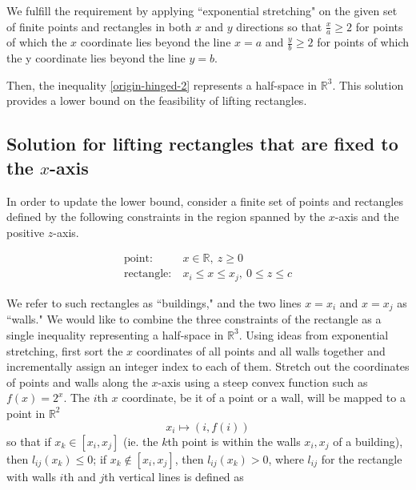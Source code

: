 \documentclass{NSF}
\begin{document}
We fulfill the requirement by applying ``exponential stretching" on the given set of finite points and rectangles in both $x$ and $y$ directions so that $\frac{x}{a} \geq 2$  for points of which the $x$ coordinate lies beyond the line $x=a$ and $\frac{y}{b} \geq 2$ for points of which the y coordinate lies beyond the line $y=b$. 

Then, the inequality \eqref{origin-hinged-2} represents a half-space in $\mathbb{R}^3$. This solution provides a lower bound on the feasibility of lifting rectangles.



\subsection{Solution for lifting rectangles that are fixed to the \texorpdfstring{$x$}{x}-axis}

In order to update the lower bound, consider a finite set of points and rectangles defined by the following constraints in the region spanned by the $x$-axis and the positive $z$-axis.

\begin{align*}
    \text{point:}& \ x \in \mathbb{R},\  z \geq 0 \\
    \text{rectangle:}& \ x_i \leq x \leq x_j,\ 0 \leq z \leq c
\end{align*}

We refer to such rectangles as ``buildings," and the two lines $x=x_i$ and $x=x_j$ as ``walls."
We would like to combine the three constraints of the rectangle as a single inequality representing a half-space in $\mathbb{R}^3$.
Using ideas from exponential stretching, first sort the $x$ coordinates of all points and all walls together and incrementally assign an integer index to each of them. Stretch out the coordinates of points and walls along the $x$-axis using a steep convex function such as $f(x)=2^x$. 
The $i$th $x$ coordinate, be it of a point or a wall, will be mapped to a point in $\mathbb{R}^2$
\begin{equation*}
	x_i \mapsto (i, f(i))
\end{equation*}
so that if $x_k \in [x_i,x_j]$ (ie. the $k$th point is within the walls $x_i,x_j$ of a building), then $l_{ij}(x_k) \leq 0 $; if $x_k \notin [x_i,x_j]$, then $l_{ij}(x_k) > 0$, where $l_{ij}$ for the rectangle with walls  $i$th and $j$th vertical lines is defined as
\end{document}
